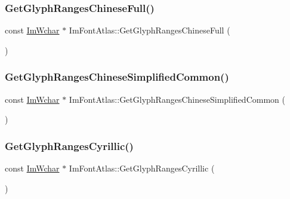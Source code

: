 \subsubsection{\texorpdfstring{Get\+Glyph\+Ranges\+Chinese\+Full()}{GetGlyphRangesChineseFull()}}
{\footnotesize\ttfamily const \mbox{\hyperlink{imgui_8h_af2c7badaf05a0008e15ef76d40875e97}{Im\+Wchar}} $\ast$ Im\+Font\+Atlas\+::\+Get\+Glyph\+Ranges\+Chinese\+Full (\begin{DoxyParamCaption}{ }\end{DoxyParamCaption})}

\mbox{\label{struct_im_font_atlas_a3a6b1a8afb01ba5e7c4d86957d6d2625}} 
\subsubsection{\texorpdfstring{Get\+Glyph\+Ranges\+Chinese\+Simplified\+Common()}{GetGlyphRangesChineseSimplifiedCommon()}}
{\footnotesize\ttfamily const \mbox{\hyperlink{imgui_8h_af2c7badaf05a0008e15ef76d40875e97}{Im\+Wchar}} $\ast$ Im\+Font\+Atlas\+::\+Get\+Glyph\+Ranges\+Chinese\+Simplified\+Common (\begin{DoxyParamCaption}{ }\end{DoxyParamCaption})}

\mbox{\label{struct_im_font_atlas_a5aaff3357d9ed401ce451c39942e869e}} 
\subsubsection{\texorpdfstring{Get\+Glyph\+Ranges\+Cyrillic()}{GetGlyphRangesCyrillic()}}
{\footnotesize\ttfamily const \mbox{\hyperlink{imgui_8h_af2c7badaf05a0008e15ef76d40875e97}{Im\+Wchar}} $\ast$ Im\+Font\+Atlas\+::\+Get\+Glyph\+Ranges\+Cyrillic (\begin{DoxyParamCaption}{ }\end{DoxyParamCaption})}

\mbox{\label{struct_im_font_atlas_adec0df140eb1dc01c2a22a5253d62820}} 
